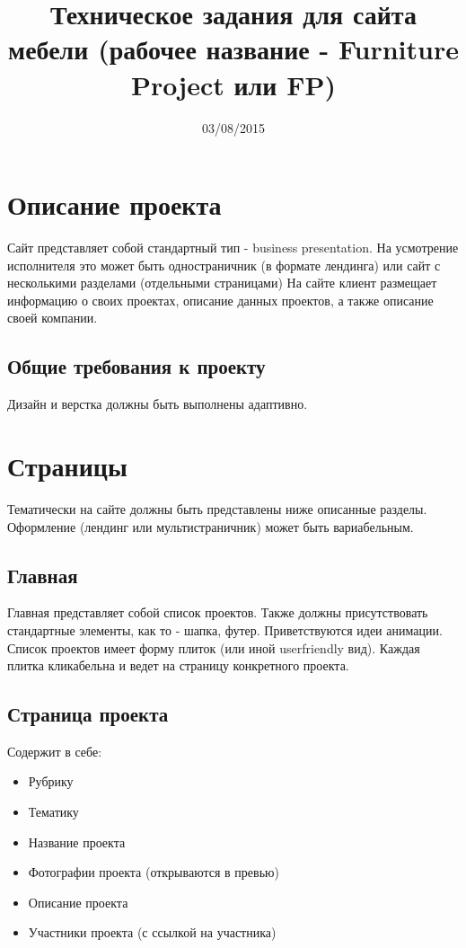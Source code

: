 \documentclass[DIV=calc, paper=a4, fontsize=11pt]{scrartcl} %
\title{Техническое задания для сайта мебели (рабочее название - Furniture Project или FP)}
\date{03/08/2015}
\begin{document}
\maketitle

\section{Описание проекта}

Сайт представляет собой стандартный тип - business presentation. На усмотрение исполнителя это может быть одностраничник (в формате лендинга) или сайт с несколькими разделами (отдельными страницами)
На сайте клиент размещает информацию о своих проектах, описание данных проектов, а также описание своей компании.

\subsection{Общие требования к проекту}
Дизайн и верстка должны быть выполнены адаптивно.

\section{Страницы}

Тематически на сайте должны быть представлены ниже описанные разделы. Оформление (лендинг или мультистраничник) может быть вариабельным.

\subsection{Главная}

Главная представляет собой список проектов. Также должны присутствовать стандартные элементы, как то - шапка, футер. Приветствуются идеи анимации.
\\[0.5cm]
Список проектов имеет форму плиток (или иной userfriendly вид). Каждая плитка кликабельна и ведет на страницу конкретного проекта.

\subsection{Страница проекта}
Содержит в себе:
\begin{itemize}
	\item Рубрику
	\item Тематику
	\item Название проекта
	\item Фотографии проекта (открываются в превью)
	\item Описание проекта
	\item Участники проекта (с ссылкой на участника)
\end{itemize}
\end{document}
